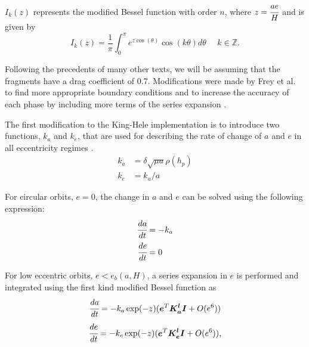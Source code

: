 \documentclass[a4paper, 12pt]{article}
\begin{document}
$I_k(z)$ represents the modified Bessel function with order $n$, where $z = \cfrac{ae}{H}$ and is given by
$$
I_k(z) = \dfrac{1}{\pi} \int_{0}^{\pi} e^{z\cos(\theta)}\cos(k\theta)d\theta \:\:\:\:\:\: k \in \mathbb{Z}.
$$

Following the precedents of many other texts, we will be assuming that the fragments have a drag coefficient of 0.7. Modifications were made by Frey et al. to find more appropriate boundary conditions and to increase the accuracy of each phase by including more terms of the series expansion \citep{frey_extension_2019}.

The first modification to the King-Hele implementation is to introduce two functions, $k_a$  and $k_e$, that are used for describing the rate of change of $a$ and $e$ in all eccentricity regimes \citep{frey_extension_2019}.
\begin{equation*}
	\begin{aligned}
	k_a &=  \delta \sqrt{\mu a}\rho(h_p)\\
	k_e &= k_a / a
	\end{aligned}
\end{equation*}


For circular orbits, $e = 0$, the change in $a$ and $e$ can be solved using the following expression:
\begin{equation*}
	\begin{aligned}
		\cfrac{da}{dt} &= -k_a\\
		\cfrac{de}{dt} &= 0
	\end{aligned}
\end{equation*}

For low eccentric orbits, $e < e_b(a, H)$, a series expansion in $e$ is performed and integrated using the first kind modified Bessel function as
\begin{equation}
		\cfrac{da}{dt}  = -k_a \exp(-z) (\boldsymbol{e}^T \boldsymbol{K_a^l} \boldsymbol{I} + O(e^6))
\end{equation}
\begin{equation}
	\cfrac{de}{dt}  = -k_e \exp(-z) (\boldsymbol{e}^T \boldsymbol{K_e^l} \boldsymbol{I} + O(e^6)),
\end{equation}
\end{document}
